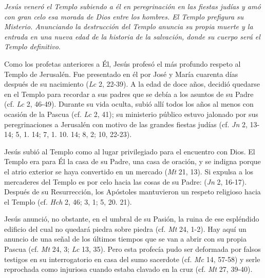 
\begin{ccebody}
 \textit{Jesús veneró el Templo subiendo a él en peregrinación en las fiestas judías y amó con gran celo esa morada de Dios entre los hombres. El Templo prefigura su Misterio. Anunciando la destrucción del Templo anuncia su propia muerte y la entrada en una nueva edad de la historia de la salvación, donde su cuerpo será el Templo definitivo}.


 Como los profetas anteriores a Él, Jesús profesó el más profundo respeto al Templo de Jerusalén. Fue presentado en él por José y María cuarenta días después de su nacimiento (\textit{Lc} 2, 22-39). A la edad de doce años, decidió quedarse en el Templo para recordar a sus padres que se debía a los asuntos de su Padre (cf. \textit{Lc} 2, 46-49). Durante su vida oculta, subió allí todos los años al menos con ocasión de la Pascua (cf. \textit{Lc} 2, 41); su ministerio público estuvo jalonado por sus peregrinaciones a Jerusalén con motivo de las grandes fiestas judías (cf. \textit{Jn} 2, 13-14; 5, 1. 14; 7, 1. 10. 14; 8, 2; 10, 22-23).

 Jesús subió al Templo como al lugar privilegiado para el encuentro con Dios. El Templo era para Él la casa de su Padre, una casa de oración, y se indigna porque el atrio exterior se haya convertido en un mercado (\textit{Mt} 21, 13). Si expulsa a los mercaderes del Templo es por celo hacia las cosas de su Padre:  (\textit{Jn} 2, 16-17). Después de su Resurrección, los Apóstoles mantuvieron un respeto religioso hacia el Templo (cf. \textit{Hch} 2, 46; 3, 1; 5, 20. 21).

 Jesús anunció, no obstante, en el umbral de su Pasión, la ruina de ese espléndido edificio del cual no quedará piedra sobre piedra (cf. \textit{Mt} 24, 1-2). Hay aquí un anuncio de una señal de los últimos tiempos que se van a abrir con su propia Pascua (cf. \textit{Mt} 24, 3; \textit{Lc} 13, 35). Pero esta profecía pudo ser deformada por falsos testigos en su interrogatorio en casa del sumo sacerdote (cf. \textit{Mc} 14, 57-58) y serle reprochada como injuriosa cuando estaba clavado en la cruz (cf. \textit{Mt} 27, 39-40).


\end{ccebody}
